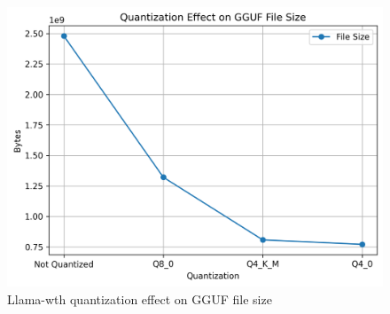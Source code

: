 \documentclass[licencjacka,en]{pracamgr}
\begin{document}
\begin{appendices}
\begin{figure}[ht]
    \centering
    \includegraphics[width=0.8\linewidth]{bachelor_images/quant_comp/quantization_effect_on_gguf_file_size.png}
    \caption{Llama-wth quantization effect on GGUF file size}
    \label{fig:quantization_effect_on_gguf_file_size}
\end{figure}


\end{appendices}
\end{document}
